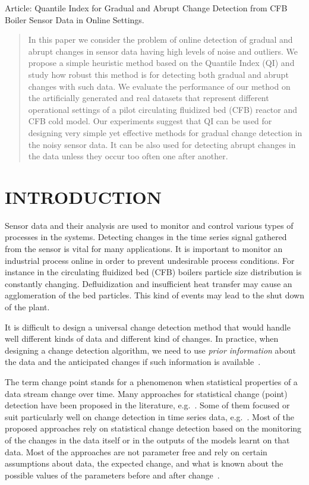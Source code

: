 
Article: Quantile Index for Gradual and Abrupt Change Detection from CFB Boiler Sensor Data in Online Settings.

\begin{abstract}
In this paper we consider the problem of online detection of gradual and abrupt changes in sensor data having high levels of noise and outliers.
We propose a simple heuristic method based on the Quantile Index (QI) and study how robust this method is for detecting both gradual and abrupt changes with such data.
We evaluate the performance of our method on the artificially generated and real datasets that represent different operational settings of a pilot circulating fluidized bed (CFB) reactor and CFB cold model. 
Our experiments suggest that QI can be used for designing very simple yet effective methods for gradual change detection in the noisy sensor data. It can be also used for detecting abrupt changes in the data unless they occur too often one after another.
\end{abstract}

\section{INTRODUCTION}
Sensor data and their analysis are used to monitor and control various types of processes in the systems.
Detecting changes in the time series signal gathered from the sensor is vital for many applications.
It is important to monitor an industrial process online in order to prevent undesirable process conditions.
For instance in the circulating fluidized bed (CFB) boilers particle size distribution is constantly changing.
Defluidization and insufficient heat transfer may cause an agglomeration of the bed particles.
This kind of events may lead to the shut down of the plant.

It is difficult to design a universal change detection method that would handle well different kinds of data and different kind of changes.
In practice, when designing a change detection algorithm, we need to use \emph{prior information} about the data and the anticipated changes if such information is available~\cite{I.V.Nikiforov}.

The term change point stands for a phenomenon when statistical properties of a data stream change over time.
Many approaches for statistical change (point) detection have been proposed in the literature, e.g.~\cite{Aggarwal05,Dasu06}. Some of them focused or suit particularly well on change detection in time series data, e.g.~\cite{journals/tkde/TakeuchiY06,cusum,BifetG07}.
Most of the proposed approaches rely on statistical change detection based on the monitoring of the changes in the data itself or in the outputs of the models learnt on that data. Most of the approaches are not parameter free and rely on certain assumptions about data, the expected change, and what is known about the possible values of the parameters before and after change~\cite{I.V.Nikiforov}.

